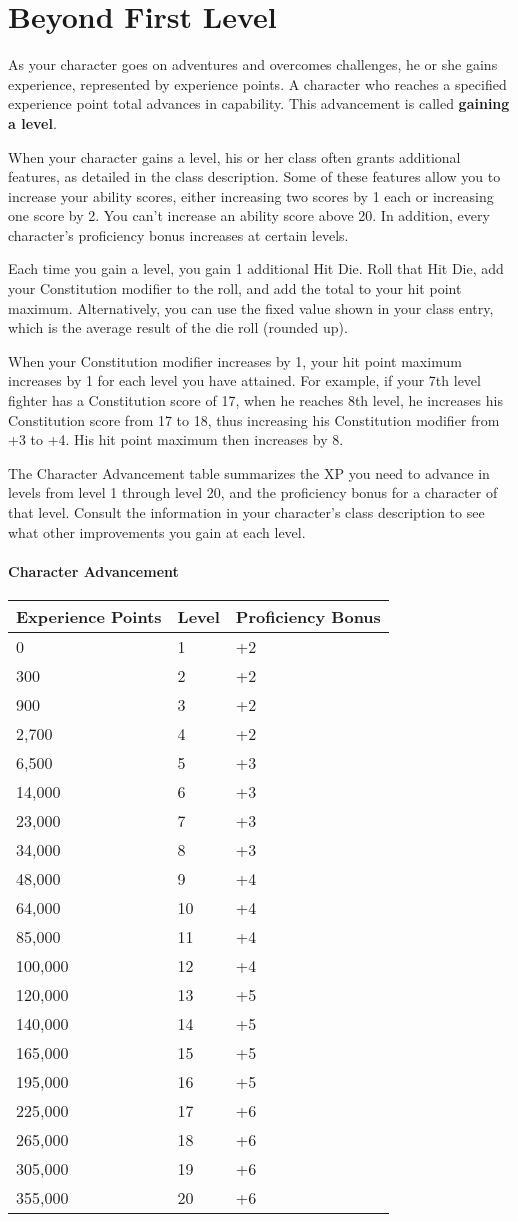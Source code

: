 \documentclass[
]{article}
\date{}
\begin{document}
\hypertarget{beyond-first-level}{%
\section{Beyond First Level}\label{beyond-first-level}}

As your character goes on adventures and overcomes challenges, he or she
gains experience, represented by experience points. A character who
reaches a specified experience point total advances in capability. This
advancement is called \textbf{gaining a level}.

When your character gains a level, his or her class often grants
additional features, as detailed in the class description. Some of these
features allow you to increase your ability scores, either increasing
two scores by 1 each or increasing one score by 2. You can't increase an
ability score above 20. In addition, every character's proficiency bonus
increases at certain levels.

Each time you gain a level, you gain 1 additional Hit Die. Roll that Hit
Die, add your Constitution modifier to the roll, and add the total to
your hit point maximum. Alternatively, you can use the fixed value shown
in your class entry, which is the average result of the die roll
(rounded up).

When your Constitution modifier increases by 1, your hit point maximum
increases by 1 for each level you have attained. For example, if your
7th level fighter has a Constitution score of 17, when he reaches 8th
level, he increases his Constitution score from 17 to 18, thus
increasing his Constitution modifier from +3 to +4. His hit point
maximum then increases by 8.

The Character Advancement table summarizes the XP you need to advance in
levels from level 1 through level 20, and the proficiency bonus for a
character of that level. Consult the information in your character's
class description to see what other improvements you gain at each level.

\hypertarget{character-advancement}{%
\paragraph{Character Advancement}\label{character-advancement}}

\begin{longtable}[]{@{}lll@{}}
\toprule
Experience Points & Level & Proficiency Bonus\tabularnewline
\midrule
\endhead
0 & 1 & +2\tabularnewline
300 & 2 & +2\tabularnewline
900 & 3 & +2\tabularnewline
2,700 & 4 & +2\tabularnewline
6,500 & 5 & +3\tabularnewline
14,000 & 6 & +3\tabularnewline
23,000 & 7 & +3\tabularnewline
34,000 & 8 & +3\tabularnewline
48,000 & 9 & +4\tabularnewline
64,000 & 10 & +4\tabularnewline
85,000 & 11 & +4\tabularnewline
100,000 & 12 & +4\tabularnewline
120,000 & 13 & +5\tabularnewline
140,000 & 14 & +5\tabularnewline
165,000 & 15 & +5\tabularnewline
195,000 & 16 & +5\tabularnewline
225,000 & 17 & +6\tabularnewline
265,000 & 18 & +6\tabularnewline
305,000 & 19 & +6\tabularnewline
355,000 & 20 & +6\tabularnewline
\bottomrule
\end{longtable}
\end{document}
